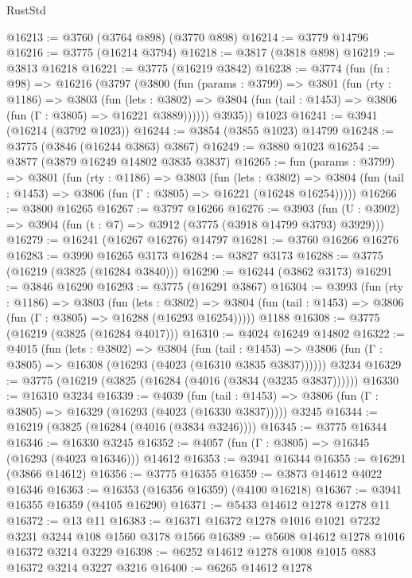 \begin{lexlean}{RustStd}
\begin{coremodule}
{\begin{coremodule}
{{{{{{{{{{{{{{{{{{{{{{{{{{{{{{{@16213 := @3760 (@3764 @898) (@3770 @898)
@16214 := @3779 @14796
@16216 := @3775 (@16214 @3794)
@16218 := @3817 (@3818 @898)
@16219 := @3813 @16218
@16221 := @3775 (@16219 @3842)
@16238 := @3774
    (fun (fn : @98) =>
    @16216
      (@3797
        (@3800
          (fun (params : @3799) =>
          @3801
            (fun (rty : @1186) =>
            @3803
              (fun (lets : @3802) =>
              @3804 (fun (tail : @1453) => @3806 (fun (Γ : @3805) => @16221 @3889))))))
        @3935))
    @1023
@16241 := @3941 (@16214 (@3792 @1023))
@16244 := @3854 (@3855 @1023) @14799
@16248 := @3775 (@3846 (@16244 @3863) @3867)
@16249 := @3880 @1023
@16254 := @3877 (@3879 @16249 @14802 @3835 @3837)
@16265 := fun (params : @3799) =>
  @3801
    (fun (rty : @1186) =>
    @3803
      (fun (lets : @3802) =>
      @3804 (fun (tail : @1453) => @3806 (fun (Γ : @3805) => @16221 (@16248 @16254)))))
@16266 := @3800 @16265
@16267 := @3797 @16266
@16276 := @3903
    (fun (U : @3902) => @3904 (fun (t : @7) => @3912 (@3775 (@3918 @14799 @3793) @3929)))
@16279 := @16241 (@16267 @16276) @14797
@16281 := @3760 @16266 @16276
@16283 := @3990 @16265 @3173
@16284 := @3827 @3173
@16288 := @3775 (@16219 (@3825 (@16284 @3840)))
@16290 := @16244 (@3862 @3173)
@16291 := @3846 @16290
@16293 := @3775 (@16291 @3867)
@16304 := @3993
    (fun (rty : @1186) =>
    @3803
      (fun (lets : @3802) =>
      @3804 (fun (tail : @1453) => @3806 (fun (Γ : @3805) => @16288 (@16293 @16254)))))
    @1188
@16308 := @3775 (@16219 (@3825 (@16284 @4017)))
@16310 := @4024 @16249 @14802
@16322 := @4015
    (fun (lets : @3802) =>
    @3804
      (fun (tail : @1453) =>
      @3806 (fun (Γ : @3805) => @16308 (@16293 (@4023 (@16310 @3835 @3837))))))
    @3234
@16329 := @3775 (@16219 (@3825 (@16284 (@4016 (@3834 (@3235 @3837))))))
@16330 := @16310 @3234
@16339 := @4039
    (fun (tail : @1453) => @3806 (fun (Γ : @3805) => @16329 (@16293 (@4023 (@16330 @3837)))))
    @3245
@16344 := @16219 (@3825 (@16284 (@4016 (@3834 @3246))))
@16345 := @3775 @16344
@16346 := @16330 @3245
@16352 := @4057 (fun (Γ : @3805) => @16345 (@16293 (@4023 @16346))) @14612
@16353 := @3941 @16344
@16355 := @16291 (@3866 @14612)
@16356 := @3775 @16355
@16359 := @3873 @14612 @4022 @16346
@16363 := @16353 (@16356 @16359) (@4100 @16218)
@16367 := @3941 @16355 @16359 (@4105 @16290)
@16371 := @5433 @14612 @1278 @1278 @11
@16372 := @13 @11
@16383 := @16371 @16372 @1278 @1016 @1021 @7232 @3231 @3244 @108 @1560 @3178 @1566
@16389 := @5608 @14612 @1278 @1016 @16372 @3214 @3229
@16398 := @6252 @14612 @1278 @1008 @1015 @883 @16372 @3214 @3227 @3216
@16400 := @6265 @14612 @1278
}}}}}}}}}}}}}}}}}}}}}}}}}}}}}}}
\end{coremodule}}
\end{coremodule}
\end{lexlean}

